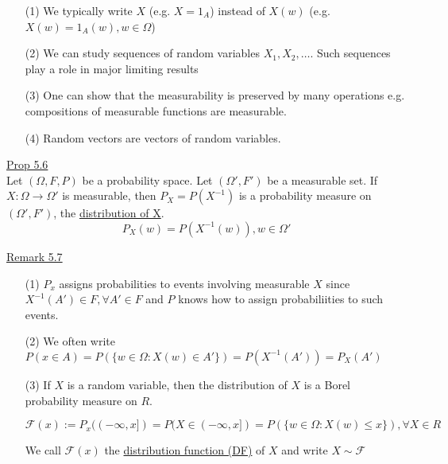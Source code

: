 \documentclass[10pt,letterpaper]{article}
\begin{document}
\begin{enumerate}

\item[(1)] We typically write $X$ (e.g. $X=1_A$) instead of $X(w)$ (e.g. $X(w)=1_A(w), w\in\Omega$)

\item[(2)] We can study sequences of random variables $X_1, X_2, \dots$. Such sequences play a role in major limiting results

\item[(3)] One can show that the measurability is preserved by many operations e.g. compositions of measurable functions are measurable.

\item[(4)] Random vectors are vectors of random variables.

\end{enumerate}

\underline{Prop 5.6}\\

Let $(\Omega, F, P)$ be a probability space. Let $(\Omega', F')$ be a measurable set. If $X:\Omega\rightarrow\Omega'$ is measurable, then $P_X=P(X^{-1})$ is a probability measure on $(\Omega', F')$, the \underline{distribution of X}.\\

$$P_X(w)=P(X^{-1}(w)), w\in\Omega'$$

\underline{Remark 5.7}\\

\begin{enumerate}

\item[(1)] $P_x$ assigns probabilities to events involving measurable $X$ since $X^{-1}(A')\in F, \forall A'\in F$ and $P$ knows how to assign probabiliities to such events.

\item[(2)] We often write $P(x\in A)=P(\{w\in\Omega: X(w)\in A'\})=P(X^{-1}(A'))=P_X(A')$

\item[(3)] If $X$ is a random variable, then the distribution of $X$ is a Borel probability measure on $R$.

$$\mathcal{F}(x):=P_x((-\infty,x])=P(X\in (-\infty, x])=P(\{w\in\Omega:X(w)\leq x\}),\forall X\in R$$

We call $\mathcal{F}(x)$ the \underline{distribution function (DF)} of $X$ and write $X\sim\mathcal{F}$

\end{enumerate}
\end{document}
